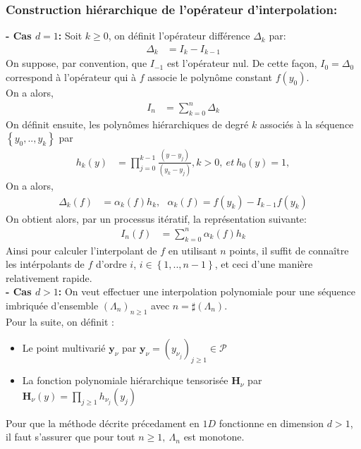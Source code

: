 \subsubsection{Construction hiérarchique de l'opérateur d'interpolation:}\label{sec:4.1.2}
\hspace{0.5cm}
\textbf{ - Cas $d=1$: }
Soit $k \geq 0$, on définit l'opérateur différence $\Delta_k$ par:
\begin{align}
   \Delta_k & =  I_k - I_{k-1}
\end{align}
On suppose, par convention, que $I_{-1}$ est l'opérateur nul. De cette façon, $I_0 = \Delta_0$ correspond à
l'opérateur qui à $f$ associe le polynôme constant $f(y_0)$.\\
On a alors,
\begin{align}
   I_n & = \sum_{k=0}^n \Delta_k
\end{align}
On définit ensuite, les polynômes hiérarchiques de degré $k$ associés à la séquence $\left \{ y_0, .. , y_k \right \}$ par
\begin{align}
	 h_k(y) & = \prod_{j=0}^{k-1} \frac{(y - y_j)}{(y_k - y_j)}, k > 0,\ et\ h_0(y) = 1,
\end{align}
On a alors,
\begin{align}
	\Delta_k(f) & = \alpha_k(f)h_k, \ \ \ \alpha_k(f) = f(y_k) - I_{k-1} f(y_k)
\end{align}
On obtient alors, par un processus itératif, la représentation suivante:
\begin{align}
   I_n(f) & = \sum_{k=0}^n \alpha_k(f)h_k
\end{align}
Ainsi pour calculer l'interpolant de $f$ en utilisant $n$ points, il suffit de connaître les intérpolants de $f$ d'ordre $i$,
$i \in \left \{1,..,n-1 \right \}$, et ceci d'une manière relativement rapide. \\

\hspace{0.5cm}
\textbf{ - Cas $d>1$: }
On veut effectuer une interpolation polynomiale pour une séquence imbriquée d'ensemble $(\Lambda_n)_{n \geq 1}$ avec $n=\sharp(\Lambda_n)$. \\
Pour la suite, on définit :
\begin{itemize}
		\item Le point multivarié $\textbf{y}_{\nu}$ par $\textbf{y}_{\nu} = (y_{\nu_j})_{j \geq 1} \in \mathcal{P}$
		\item La fonction polynomiale hiérarchique tensorisée $\textbf{H}_{\nu}$ par $\textbf{H}_{\nu}(y) = \prod_{j \geq 1} h_{\nu_j} (y_j)$
\end{itemize}
		Pour que la méthode décrite précedament en $1D$ fonctionne en dimension $d>1$, il faut s'assurer que pour tout $n \geq 1,\ \Lambda_n$ est monotone. \\

